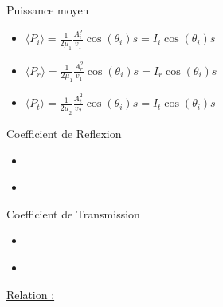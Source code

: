 \documentclass[12pt]{book}
\begin{document}
            Puissance moyen
            \begin{itemize}
                \item $\langle P_i \rangle = \frac{1}{2\mu_1}\frac{A_i^2}{v_1}\cos(\theta_i)s= I_i\cos(\theta_i)s $
                \item $\langle P_r \rangle = \frac{1}{2\mu_1}\frac{A_r^2}{v_1}\cos(\theta_i)s= I_r\cos(\theta_i)s $
                \item $\langle P_t \rangle = \frac{1}{2\mu_2}\frac{A_t^2}{v_2}\cos(\theta_i)s= I_t\cos(\theta_i)s $
            \end{itemize}
                \begin{center}
                    Coefficient de Reflexion
                \end{center}
                \begin{itemize}
                    \item 
                        \begin{center}
                        \end{center}
                    \item 
                    \begin{center}
                    \end{center}
                \end{itemize}
                \begin{center}
                    Coefficient de Transmission
                \end{center}
                \begin{itemize}
                    \item 
                        \begin{center}
                        \end{center}
                    \item 
                        \begin{center}
                        \end{center}
                
                \end{itemize}
                \underline{Relation :} 
\end{document}
